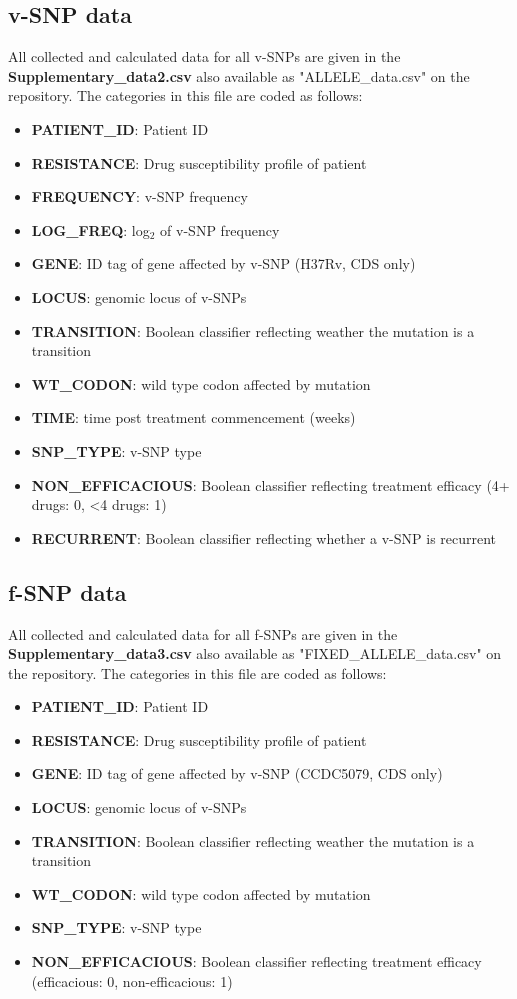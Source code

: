 \documentclass[12pt, oneside]{article}   	%
\begin{document}
\subsection{v-SNP data}
All collected and calculated data for all v-SNPs are given in the \textbf{Supplementary\_data2.csv} also available as "ALLELE\_data.csv" on the repository.
The categories in this file are coded as follows:
\begin{itemize}
\item \textbf{PATIENT\_ID}: Patient ID
\item \textbf{RESISTANCE}:  Drug susceptibility profile of patient
\item \textbf{FREQUENCY}: v-SNP frequency
\item \textbf{LOG\_FREQ}: log$_2$ of v-SNP frequency
\item \textbf{GENE}: ID tag of gene affected by v-SNP (H37Rv, CDS only)
\item \textbf{LOCUS}:  genomic locus of v-SNPs
\item \textbf{TRANSITION}: Boolean classifier reflecting weather the mutation is a transition
\item \textbf{WT\_CODON}: wild type codon affected by mutation
\item \textbf{TIME}: time post treatment commencement (weeks)
\item \textbf{SNP\_TYPE}: v-SNP type
\item \textbf{NON\_EFFICACIOUS}: Boolean classifier reflecting treatment efficacy (4+ drugs: 0, <4 drugs: 1)
\item \textbf{RECURRENT}: Boolean classifier reflecting whether a v-SNP is recurrent
\end{itemize}

\subsection{f-SNP data}
All collected and calculated data for all f-SNPs are given in the \textbf{Supplementary\_data3.csv} also available as "FIXED\_ALLELE\_data.csv" on the repository.
The categories in this file are coded as follows:
\begin{itemize}
\item \textbf{PATIENT\_ID}: Patient ID
\item \textbf{RESISTANCE}: Drug susceptibility profile of patient
\item \textbf{GENE}: ID tag of gene affected by v-SNP (CCDC5079, CDS only)
\item \textbf{LOCUS}:  genomic locus of v-SNPs
\item \textbf{TRANSITION}: Boolean classifier reflecting weather the mutation is a transition
\item \textbf{WT\_CODON}: wild type codon affected by mutation
\item \textbf{SNP\_TYPE}: v-SNP type
\item \textbf{NON\_EFFICACIOUS}: Boolean classifier reflecting treatment efficacy (efficacious: 0, non-efficacious: 1)
\end{itemize}
\end{document}
